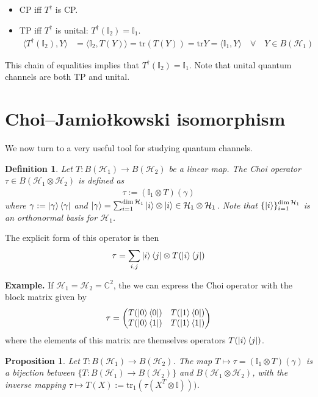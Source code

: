 \documentclass[10pt,oneside,longbibliography]{report}
\newtheorem{proposition}{Proposition}[section]
\newtheorem{definition}{Definition}[section]
\begin{document}
\begin{itemize}
    \item CP iff $T^{\dagger}$ is CP.
    \item TP iff $T^{\dagger}$ is unital: $T^{\dagger}(\mathbb{I}_2)=\mathbb{I}_1$.
    \begin{align}
        \langle T^{\dagger}(\mathbb{I}_2),Y \rangle &= \langle \mathbb{I}_2,T(Y)\rangle = \text{tr}(T(Y))=\text{tr}Y = \langle \mathbb{I}_1, Y\rangle \quad \forall \quad Y \in B(\mathcal{H}_1)
    \end{align}
\end{itemize}
This chain of equalities implies that $T^{\dagger}(\mathbb{I}_2)=\mathbb{I}_1$. Note that unital quantum channels are both TP and unital.

\section{
Choi–Jamiołkowski isomorphism}
We now turn to a very useful tool for studying quantum channels. 
\begin{definition}
Let $T:B(\mathcal{H}_1)\rightarrow B(\mathcal{H}_2)$ be a linear map. The Choi operator $\tau \in B(\mathcal{H}_1 \otimes \mathcal{H}_2)$ is defined as 
\begin{align}
    \tau := (\mathbb{I}_1\otimes T)(\gamma) 
\end{align}
where $\gamma := \ket{\gamma}\bra{\gamma}$ and $\ket{\gamma}=\sum_{i=1}^{\dim\mathcal{H}_1} \ket{i}\otimes \ket{i} \in \mathcal{H}_1 \otimes \mathcal{H}_1 $. Note that $\{\ket{i}\}_{i=1}^{\dim\mathcal{H}_1}$ is an orthonormal basis for $\mathcal{H}_1$. 
\end{definition}
The explicit form of this operator is then
\begin{align}
    \tau = \sum_{i,j} \ket{i}\bra{j} \otimes T(\ket{i}\bra{j})
\end{align}

\begin{tcolorbox}[colframe=black,breakable, colback=brown!8, arc=0pt, outer arc=0pt,boxrule=0.5pt]
\textbf{Example.} If $\mathcal{H}_1 = \mathcal{H}_2=\mathbb{C}^2$, the we can express the Choi operator with the block matrix given by
\begin{align}
    \tau = \begin{pmatrix}
    T(\ket{0}\bra{0}) & T(\ket{1}\bra{0})\\
    T(\ket{0}\bra{1}) & T(\ket{1}\bra{1})
    \end{pmatrix}
\end{align}
where the elements of this matrix are themselves operators $T(\ket{i}\bra{j})$.
\end{tcolorbox}
\begin{proposition}
Let $T: B(\mathcal{H}_1)\rightarrow B(\mathcal{H}_2)$. The map $T \mapsto \tau = (\mathbb{I}_1 \otimes T)(\gamma)$ is a bijection between $\{T: B(\mathcal{H}_1)\rightarrow B(\mathcal{H}_2)\}$ and $B(\mathcal{H}_1 \otimes \mathcal{H}_2)$, with the inverse mapping $\tau \mapsto T(X):=\text{tr}_1(\tau(X^{T}\otimes \mathbb{I})))$.
\end{proposition}
\end{document}
